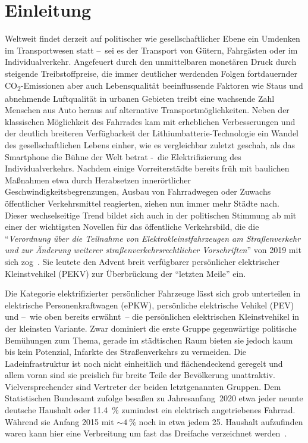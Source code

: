 \chapter{Einleitung}
	Weltweit findet derzeit auf politischer wie gesellschaftlicher Ebene ein Umdenken im Transportwesen statt --~sei es der Transport von Gütern, Fahrgästen oder im Individualverkehr.
	Angefeuert durch den unmittelbaren monetären Druck durch steigende Treibstoffpreise, die immer deutlicher werdenden Folgen fortdauernder CO\textsubscript{2}-Emissionen aber auch Lebensqualität beeinflussende Faktoren wie Staus und abnehmende Luftqualität in urbanen Gebieten treibt eine wachsende Zahl Menschen aus Auto heraus auf alternative Transportmöglichkeiten.
	Neben der klassischen Möglichkeit des Fahrrades kam mit erheblichen Verbesserungen und der deutlich breiteren Verfügbarkeit der Lithiumbatterie-Technologie ein Wandel des gesellschaftlichen Lebens einher, wie es vergleichbar zuletzt geschah, als das Smartphone die Bühne der Welt betrat -~die Elektrifizierung des Individualverkehrs.
	Nachdem einige Vorreiterstädte bereits früh mit baulichen Maßnahmen etwa durch Herabsetzen innerörtlicher Geschwindigkeitsbegrenzungen, Ausbau von Fahrradwegen oder Zuwachs öffentlicher Verkehrsmittel reagierten, ziehen nun immer mehr Städte nach.
	Dieser wechselseitige Trend bildet sich auch in der politischen Stimmung ab mit einer der wichtigsten Novellen für das öffentliche Verkehrsbild, die die ``\textit{Verordnung über die Teilnahme von Elektrokleinstfahrzeugen am Straßenverkehr und zur Änderung weiterer straßenverkehrsrechtlicher Vorschriften}'' von 2019 mit sich zog~\cite{Bundesgesetzblatt.2019}.
	Sie leutete den Advent breit verfügbarer persönlicher elektrischer Kleinstvehikel (PEKV) zur Überbrückung der ``letzten Meile'' ein.\par\medskip
	Die Kategorie elektrifizierter persönlicher Fahrzeuge lässt sich grob unterteilen in elektrische Personenkraftwagen (ePKW), persönliche elektrische Vehikel (PEV) und --~wie oben bereits erwähnt~-- die persönlichen elektrischen Kleinstvehikel in der kleinsten Variante.
	Zwar dominiert die erste Gruppe gegenwärtige politische Bemühungen zum Thema, gerade im städtischen Raum bieten sie jedoch kaum bis kein Potenzial, Infarkte des Straßenverkehrs zu vermeiden.
	Die Ladeinfrastruktur ist noch nicht einheitlich und flächendeckend geregelt und allem voran sind sie preislich für breite Teile der Bevölkerung unattraktiv.
	Vielversprechender sind Vertreter der beiden letztgenannten Gruppen.
	Dem Statistischen Bundesamt zufolge besaßen zu Jahresanfang~2020 etwa jeder neunte deutsche Haushalt oder \SI{11,4}{\percent} zumindest ein elektrisch angetriebenes Fahrrad.
	Während sie Anfang 2015 mit \(\sim \SI{4}{\percent}\) noch in etwa jedem 25. Haushalt aufzufinden waren kann hier eine Verbreitung um fast das Dreifache verzeichnet werden~\cite{zahl.der.ebikes.StatistischesBundesamt.2020.09.28}.\par\medskip